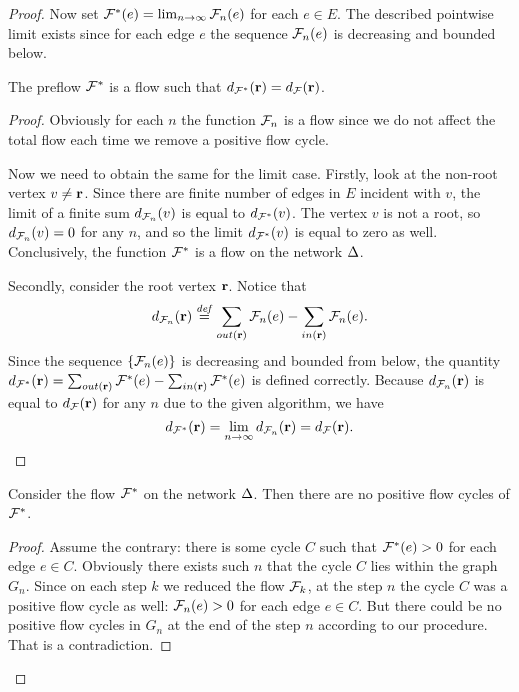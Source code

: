 \documentclass[12pt]{amsart}
\begin{document}
\begin{proof}
      Now set $\mathcal{F^{*}}(e) = \lim_{n \to \infty} \mathcal{F}_{n}(e)$ for each $e \in E$.
      The described pointwise limit exists since for each edge $e$ the sequence $\mathcal{F}_{n}(e)$ is decreasing and bounded below.
      \begin{prop}
        The preflow $\mathcal{F^{*}}$ is a flow such that $d_{\mathcal{F^{*}}}(\mathbf{r}) = d_{\mathcal{F}}(\mathbf{r})$.
      \end{prop}
      \begin{proof}
        Obviously for each $n$ the function $\mathcal{F}_{n}$ is a flow since we do not affect the total flow each time we remove a positive flow cycle.

        Now we need to obtain the same for the limit case.
        Firstly, look at the non-root vertex $v \neq \mathbf{r}$.
        Since there are finite number of edges in $E$ incident with $v$, the limit of
          a finite sum $d_{\mathcal{F}_{n}}(v)$ is equal to $d_{\mathcal{F^{*}}}(v)$.
        The vertex $v$ is not a root, so $d_{\mathcal{F}_{n}}(v) = 0$ for any $n$, and so the limit $d_{\mathcal{F^{*}}}(v)$ is equal to zero as well.
        Conclusively, the function $\mathcal{F^{*}}$ is a flow on the network $\Delta$.

        Secondly, consider the root vertex $\mathbf{r}$.
        Notice that
        \[
          d_{\mathcal{F}_{n}}(\mathbf{r}) \overset{\mathit{def}}{=} \sum_{out(\mathbf{r})} \mathcal{F}_{n}(e) - \sum_{in(\mathbf{r})} \mathcal{F}_{n}(e).
        \]
        Since the sequence $\{\mathcal{F}_{n}(e)\}$ is decreasing and bounded from below,
          the quantity $d_{\mathcal{F^{*}}}(\mathbf{r})=\sum_{out(\mathbf{r})} \mathcal{F^{*}}(e) - \sum_{in(\mathbf{r})} \mathcal{F^{*}}(e)$ is defined correctly.
        Because $d_{\mathcal{F}_{n}}(\mathbf{r})$ is equal to $d_{\mathcal{F}}(\mathbf{r})$ for any $n$ due to the given algorithm, we have
        \[
          d_{\mathcal{F^{*}}}(\mathbf{r}) = \lim_{n \to \infty} d_{\mathcal{F}_{n}}(\mathbf{r}) = d_{\mathcal{F}}(\mathbf{r}).
        \]
      \end{proof}
      \begin{prop}
        Consider the flow $\mathcal{F^{*}}$ on the network $\Delta$.
        Then there are no positive flow cycles of $\mathcal{F^{*}}$.
      \end{prop}
      \begin{proof}
        Assume the contrary: there is some cycle $C$ such that $\mathcal{F^{*}}(e) > 0$ for
          each edge $e \in C$.
        Obviously there exists such $n$ that the cycle $C$ lies within the graph $G_n$.
        Since on each step $k$ we reduced the flow $\mathcal{F}_{k}$, at the step $n$
          the cycle $C$ was a positive flow cycle as well: $\mathcal{F}_{n}(e) > 0$ for each edge $e \in C$.
        But there could be no positive flow cycles in $G_n$ at the end of the step $n$ according to our procedure.
        That is a contradiction.
      \end{proof}


\end{proof}
\end{document}
